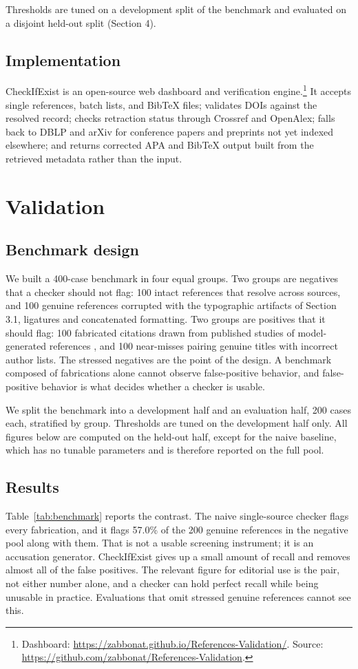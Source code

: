 \documentclass[11pt, a4paper]{article}
\begin{document}
Thresholds are tuned on a development split of the benchmark and evaluated on a disjoint held-out split (Section 4).

\subsection{Implementation}
CheckIfExist is an open-source web dashboard and verification engine.\footnote{Dashboard: \url{https://zabbonat.github.io/References-Validation/}. Source: \url{https://github.com/zabbonat/References-Validation}.} It accepts single references, batch lists, and BibTeX files; validates DOIs against the resolved record; checks retraction status through Crossref and OpenAlex; falls back to DBLP and arXiv for conference papers and preprints not yet indexed elsewhere; and returns corrected APA and BibTeX output built from the retrieved metadata rather than the input.

\section{Validation}
\subsection{Benchmark design}
We built a 400-case benchmark in four equal groups. Two groups are negatives that a checker should not flag: 100 intact references that resolve across sources, and 100 genuine references corrupted with the typographic artifacts of Section 3.1, ligatures and concatenated formatting. Two groups are positives that it should flag: 100 fabricated citations drawn from published studies of model-generated references \citep{bhattacharyya2023, walters2023}, and 100 near-misses pairing genuine titles with incorrect author lists. The stressed negatives are the point of the design. A benchmark composed of fabrications alone cannot observe false-positive behavior, and false-positive behavior is what decides whether a checker is usable.

We split the benchmark into a development half and an evaluation half, 200 cases each, stratified by group. Thresholds are tuned on the development half only. All figures below are computed on the held-out half, except for the naive baseline, which has no tunable parameters and is therefore reported on the full pool.

\subsection{Results}
Table~\ref{tab:benchmark} reports the contrast. The naive single-source checker flags every fabrication, and it flags 57.0\% of the 200 genuine references in the negative pool along with them. That is not a usable screening instrument; it is an accusation generator. CheckIfExist gives up a small amount of recall and removes almost all of the false positives. The relevant figure for editorial use is the pair, not either number alone, and a checker can hold perfect recall while being unusable in practice. Evaluations that omit stressed genuine references cannot see this.
\end{document}
